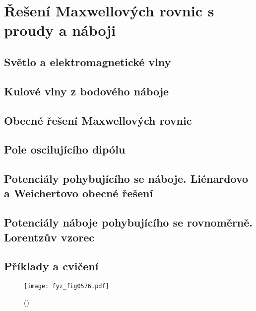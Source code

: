 \setchaptertoc
\chapter{Řešení Maxwellových rovnic s proudy a náboji}\label{fyz:IIchapXXI}

  \section{Světlo a elektromagnetické vlny}\label{fyz:IIchapXXIsecI}
  \section{Kulové vlny z bodového náboje}\label{fyz:IIchapXXIsecII}
  \section{Obecné řešení Maxwellových rovnic}\label{fyz:IIchapXXIsecIII}
  \section{Pole oscilujícího dipólu}\label{fyz:IIchapXXIsecIV}
  \section{Potenciály pohybujícího se náboje. Liénardovo a Weichertovo obecné 
  řešení}\label{fyz:IIchapXXIsecV}
  \section{Potenciály náboje pohybujícího se rovnoměrně. Lorentzův vzorec	
  }\label{fyz:IIchapXXIsecVI}
  \section{Příklady a cvičení}\label{fyz:IIchapXXIsecVII}



    \begin{figure}[ht!] %
      \centering
      \texttt{[image: fyz\_fig0576.pdf]}
      \caption{
               (\cite[s.~707]{Feynman02})}
      \label{fyz:fig0576}
    \end{figure}

